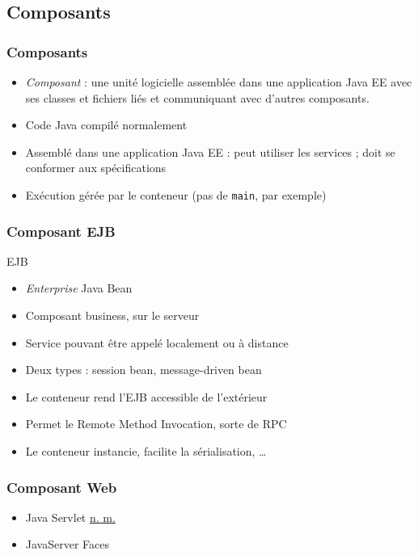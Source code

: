 \documentclass[english, french]{beamer}
\begin{document}
\subsection{Composants}
\begin{frame}
	\frametitle{Composants}
	\begin{itemize}
		\item \emph{Composant} : une unité logicielle assemblée dans une application Java EE avec ses classes et fichiers liés et communiquant avec d’autres composants.
		\item Code Java compilé normalement
		\item Assemblé dans une application Java EE : peut utiliser les services ; doit se conformer aux spécifications
		\item Exécution gérée par le conteneur (pas de \texttt{main}, par exemple)
	\end{itemize}
\end{frame}

\begin{frame}
	\frametitle{Composant EJB}
	\begin{block}{EJB}
		\begin{itemize}
			\item \emph{Enterprise} Java Bean
			\item Composant \og{}business\fg{}, sur le serveur
			\item Service pouvant être appelé localement ou à distance
			\item Deux types : session bean, message-driven bean
		\end{itemize}
	\end{block}
	\begin{itemize}
		\item Le conteneur rend l’EJB accessible de l’extérieur
		\item Permet le Remote Method Invocation, sorte de RPC
		\item Le conteneur instancie, facilite la sérialisation, …
	\end{itemize}
\end{frame}

\begin{frame}
	\frametitle{Composant Web}
	\begin{itemize}
		\item Java Servlet {\tiny \href{http://www.oqlf.gouv.qc.ca/ressources/bibliotheque/dictionnaires/internet/fiches/8386532.html}{n. m.}}
		\item JavaServer Faces
	\end{itemize}
\end{frame}
\end{document}
